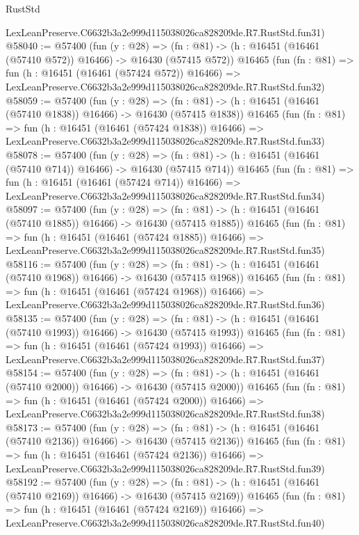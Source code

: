 \begin{lexlean}{RustStd}
\begin{coremodule}
    LexLeanPreserve.C6632b3a2e999d115038026ca828209de.R7.RustStd.fun31)
@58040 := @57400
    (fun (y : @28) =>
    (fn : @81) -> (h : @16451 (@16461 (@57410 @572)) @16466) -> @16430 (@57415 @572))
    @16465
    (fun (fn : @81) =>
    fun (h : @16451 (@16461 (@57424 @572)) @16466) =>
    LexLeanPreserve.C6632b3a2e999d115038026ca828209de.R7.RustStd.fun32)
@58059 := @57400
    (fun (y : @28) =>
    (fn : @81) -> (h : @16451 (@16461 (@57410 @1838)) @16466) -> @16430 (@57415 @1838))
    @16465
    (fun (fn : @81) =>
    fun (h : @16451 (@16461 (@57424 @1838)) @16466) =>
    LexLeanPreserve.C6632b3a2e999d115038026ca828209de.R7.RustStd.fun33)
@58078 := @57400
    (fun (y : @28) =>
    (fn : @81) -> (h : @16451 (@16461 (@57410 @714)) @16466) -> @16430 (@57415 @714))
    @16465
    (fun (fn : @81) =>
    fun (h : @16451 (@16461 (@57424 @714)) @16466) =>
    LexLeanPreserve.C6632b3a2e999d115038026ca828209de.R7.RustStd.fun34)
@58097 := @57400
    (fun (y : @28) =>
    (fn : @81) -> (h : @16451 (@16461 (@57410 @1885)) @16466) -> @16430 (@57415 @1885))
    @16465
    (fun (fn : @81) =>
    fun (h : @16451 (@16461 (@57424 @1885)) @16466) =>
    LexLeanPreserve.C6632b3a2e999d115038026ca828209de.R7.RustStd.fun35)
@58116 := @57400
    (fun (y : @28) =>
    (fn : @81) -> (h : @16451 (@16461 (@57410 @1968)) @16466) -> @16430 (@57415 @1968))
    @16465
    (fun (fn : @81) =>
    fun (h : @16451 (@16461 (@57424 @1968)) @16466) =>
    LexLeanPreserve.C6632b3a2e999d115038026ca828209de.R7.RustStd.fun36)
@58135 := @57400
    (fun (y : @28) =>
    (fn : @81) -> (h : @16451 (@16461 (@57410 @1993)) @16466) -> @16430 (@57415 @1993))
    @16465
    (fun (fn : @81) =>
    fun (h : @16451 (@16461 (@57424 @1993)) @16466) =>
    LexLeanPreserve.C6632b3a2e999d115038026ca828209de.R7.RustStd.fun37)
@58154 := @57400
    (fun (y : @28) =>
    (fn : @81) -> (h : @16451 (@16461 (@57410 @2000)) @16466) -> @16430 (@57415 @2000))
    @16465
    (fun (fn : @81) =>
    fun (h : @16451 (@16461 (@57424 @2000)) @16466) =>
    LexLeanPreserve.C6632b3a2e999d115038026ca828209de.R7.RustStd.fun38)
@58173 := @57400
    (fun (y : @28) =>
    (fn : @81) -> (h : @16451 (@16461 (@57410 @2136)) @16466) -> @16430 (@57415 @2136))
    @16465
    (fun (fn : @81) =>
    fun (h : @16451 (@16461 (@57424 @2136)) @16466) =>
    LexLeanPreserve.C6632b3a2e999d115038026ca828209de.R7.RustStd.fun39)
@58192 := @57400
    (fun (y : @28) =>
    (fn : @81) -> (h : @16451 (@16461 (@57410 @2169)) @16466) -> @16430 (@57415 @2169))
    @16465
    (fun (fn : @81) =>
    fun (h : @16451 (@16461 (@57424 @2169)) @16466) =>
    LexLeanPreserve.C6632b3a2e999d115038026ca828209de.R7.RustStd.fun40)

\end{coremodule}
\end{lexlean}
